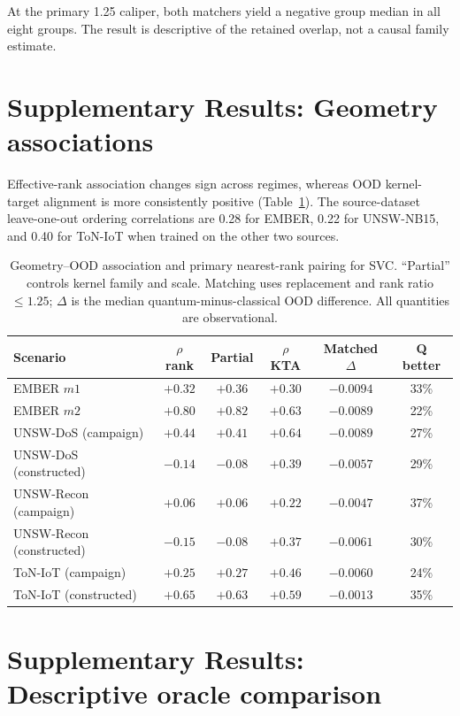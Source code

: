 \documentclass[11pt]{article}
\begin{document}
At the primary 1.25 caliper, both matchers yield a negative group median in
all eight groups. The result is descriptive of the retained overlap, not a
causal family estimate.

\section*{Supplementary Results: Geometry associations}
\label{supp:geometry}

Effective-rank association changes sign across regimes, whereas OOD
kernel-target alignment is more consistently positive
(Table~\ref{supp:tab_geometry}). The source-dataset leave-one-out ordering
correlations are 0.28 for EMBER, 0.22 for UNSW-NB15, and 0.40 for ToN-IoT
when trained on the other two sources.

\begin{table}[ht]
\centering
\caption{Geometry--OOD association and primary nearest-rank pairing for SVC.
``Partial'' controls kernel family and scale. Matching uses replacement and
rank ratio $\leq1.25$; $\Delta$ is the median quantum-minus-classical OOD
difference. All quantities are observational.}
\label{supp:tab_geometry}
\small
\setlength{\tabcolsep}{4pt}
\begin{tabular}{lccccc}
\toprule
Scenario & $\rho$ rank & Partial & $\rho$ KTA & Matched $\Delta$ & Q better \\
\midrule
EMBER $m1$ & $+0.32$ & $+0.36$ & $+0.30$ & $-0.0094$ & 33\% \\
EMBER $m2$ & $+0.80$ & $+0.82$ & $+0.63$ & $-0.0089$ & 22\% \\
UNSW-DoS (campaign) & $+0.44$ & $+0.41$ & $+0.64$ & $-0.0089$ & 27\% \\
UNSW-DoS (constructed) & $-0.14$ & $-0.08$ & $+0.39$ & $-0.0057$ & 29\% \\
UNSW-Recon (campaign) & $+0.06$ & $+0.06$ & $+0.22$ & $-0.0047$ & 37\% \\
UNSW-Recon (constructed) & $-0.15$ & $-0.08$ & $+0.37$ & $-0.0061$ & 30\% \\
ToN-IoT (campaign) & $+0.25$ & $+0.27$ & $+0.46$ & $-0.0060$ & 24\% \\
ToN-IoT (constructed) & $+0.65$ & $+0.63$ & $+0.59$ & $-0.0013$ & 35\% \\
\bottomrule
\end{tabular}
\end{table}

\section*{Supplementary Results: Descriptive oracle comparison}
\label{supp:oracle}
\end{document}
